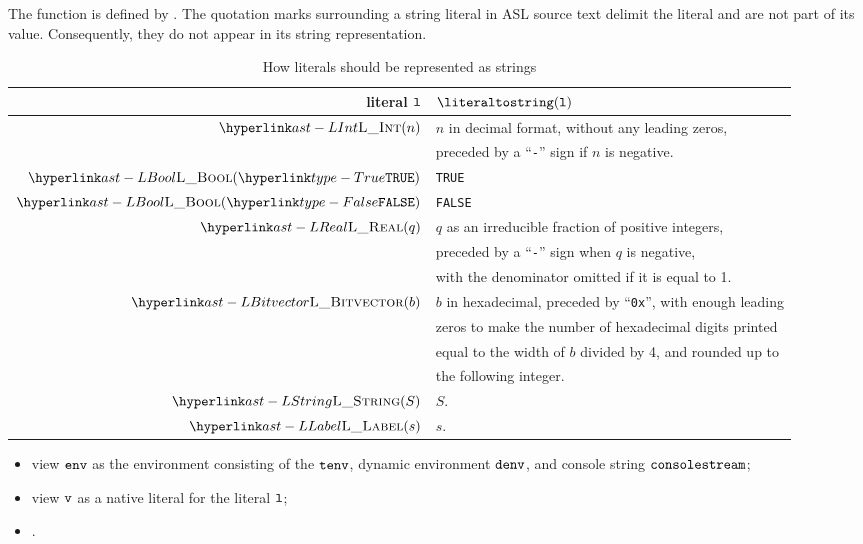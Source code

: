 The function is defined by .
%
The quotation marks surrounding a string literal in ASL source text delimit the literal
and are not part of its value. Consequently, they do not appear in its string representation.

\begin{table}
\caption{How literals should be represented as strings\label{ta:literaltostringtable}}
\begin{tabular}{rl}
\textbf{literal $\texttt{l}$} & \textbf{$\literaltostring(\vl)$} \\
\hline
$\LInt(n)$        & $n$ in decimal format, without any leading zeros, \\
                  & preceded by a ``\texttt{-}'' sign if $n$ is negative. \\
$\LBool(\True)$   & \texttt{TRUE} \\
$\LBool(\False)$  & \texttt{FALSE} \\
$\LReal(q)$       & $q$ as an irreducible fraction of positive integers, \\
                  & preceded by a ``\texttt{-}'' sign when $q$ is negative, \\
                  & with the denominator omitted if it is equal to 1. \\
$\LBitvector(b)$  & $b$ in hexadecimal, preceded by ``\texttt{0x}'', with enough leading \\
                  & zeros to make the number of hexadecimal digits printed \\
                  & equal to the width of $b$ divided by 4, and rounded up to \\
                  & the following integer.\\
$\LString(S)$     & $S$. \\
$\LLabel(s)$      & $s$. \\
\end{tabular}
\end{table}

\ProseParagraph
\AllApply
\begin{itemize}
  \item view $\texttt{env}$ as the environment consisting of the \staticenvironmentterm{} $\texttt{tenv}$,
        dynamic environment $\texttt{denv}$, and console string $\texttt{consolestream}$;
  \item view $\texttt{v}$ as a native literal for the literal $\texttt{l}$;
  \item {}.
\end{itemize}

